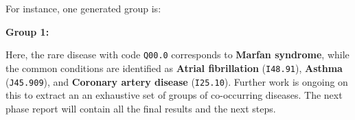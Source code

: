 For instance, one generated group is:
\begin{center}
\textbf{Group 1:} \quad ['Q00.0', 'I48.91', 'J45.909', 'I25.10']
\end{center}
Here, the rare disease with code \texttt{Q00.0} corresponds to \textbf{Marfan syndrome}, while the common conditions are identified as \textbf{Atrial fibrillation} (\texttt{I48.91}), \textbf{Asthma} (\texttt{J45.909}), and \textbf{Coronary artery disease} (\texttt{I25.10}). Further work is ongoing on this to extract an an exhaustive set of groups of co-occurring diseases. The next phase report will contain all the final results and the next steps.